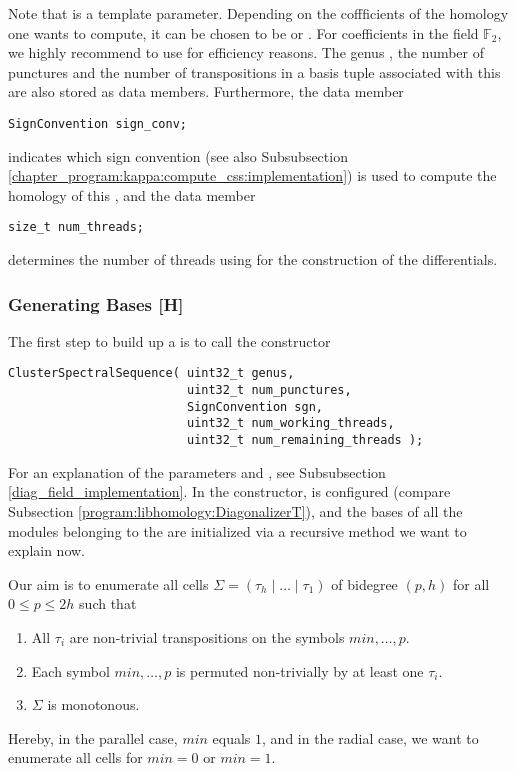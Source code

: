 Note that  is a template parameter. 
Depending on the coffficients of the homology one wants to compute,
it can be chosen to be  or .
For coefficients in the field $\mathbb F_2$, we highly recommend to use  for efficiency reasons.
The genus , the number of punctures  and the number  of transpositions in a basis tuple 
associated with this  are also stored as data members. 
Furthermore, the data member
\begin{lstlisting}
SignConvention sign_conv;
\end{lstlisting}
indicates which sign convention (see also Subsubsection \ref{chapter_program:kappa:compute_css:implementation}) is used to compute the homology of this ,
and the data member
\begin{lstlisting}
size_t num_threads;
\end{lstlisting}
determines the number of threads using for the construction of the differentials.

\subsubsection{Generating Bases [H]}
\label{chapter_program:kappa:css:gen_bases}

The first step to build up a  is to call the constructor
\begin{lstlisting}
ClusterSpectralSequence( uint32_t genus, 
                         uint32_t num_punctures, 
                         SignConvention sgn, 
                         uint32_t num_working_threads, 
                         uint32_t num_remaining_threads );
\end{lstlisting}
For an explanation of the parameters  and , 
see Subsubsection \ref{diag_field_implementation}.
In the constructor,  is configured (compare Subsection \ref{program:libhomology:DiagonalizerT}), 
and the bases of all the modules belonging to the  are initialized 
via a recursive method we want to explain now. 

Our aim is to enumerate all cells $\Sigma = (\tau_h \mid \ldots \mid \tau_1)$ 
of bidegree $(p, h)$ for all $0 \leq p \leq 2h$ such that
\begin{enumerate}
 \item All $\tau_i$ are non-trivial transpositions on the symbols $min, \dotsc, p$.
 \item Each symbol $min, \dotsc, p$ is permuted non-trivially by at least one $\tau_i$.
 \item $\Sigma$ is monotonous.
\end{enumerate}
Hereby, in the parallel case, $min$ equals $1$, and in the radial case, we want to enumerate all cells for $min = 0$ or $min = 1$.

